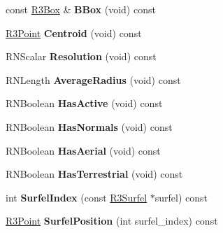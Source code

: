 \begin{DoxyCompactItemize}
\item 
const \hyperlink{class_r3_box}{R3\+Box} \& {\bfseries B\+Box} (void) const \hypertarget{class_r3_surfel_block_a199ed33bd0e6ecbac0a6fa9db61edbbc}{}\label{class_r3_surfel_block_a199ed33bd0e6ecbac0a6fa9db61edbbc}

\item 
\hyperlink{class_r3_point}{R3\+Point} {\bfseries Centroid} (void) const \hypertarget{class_r3_surfel_block_ab939d981e8601c1c534276e904ed0bae}{}\label{class_r3_surfel_block_ab939d981e8601c1c534276e904ed0bae}

\item 
R\+N\+Scalar {\bfseries Resolution} (void) const \hypertarget{class_r3_surfel_block_a190abcd92713a2d43b79f4eec1330361}{}\label{class_r3_surfel_block_a190abcd92713a2d43b79f4eec1330361}

\item 
R\+N\+Length {\bfseries Average\+Radius} (void) const \hypertarget{class_r3_surfel_block_a882e924ab6699914917994f6adb3276d}{}\label{class_r3_surfel_block_a882e924ab6699914917994f6adb3276d}

\item 
R\+N\+Boolean {\bfseries Has\+Active} (void) const \hypertarget{class_r3_surfel_block_a3b42233c643f7be3dee410ad08a4c1a4}{}\label{class_r3_surfel_block_a3b42233c643f7be3dee410ad08a4c1a4}

\item 
R\+N\+Boolean {\bfseries Has\+Normals} (void) const \hypertarget{class_r3_surfel_block_a0992d009761f9d22cd52d8bf8052607a}{}\label{class_r3_surfel_block_a0992d009761f9d22cd52d8bf8052607a}

\item 
R\+N\+Boolean {\bfseries Has\+Aerial} (void) const \hypertarget{class_r3_surfel_block_ac782863b9d9e89cbfa1622d8b0788277}{}\label{class_r3_surfel_block_ac782863b9d9e89cbfa1622d8b0788277}

\item 
R\+N\+Boolean {\bfseries Has\+Terrestrial} (void) const \hypertarget{class_r3_surfel_block_a7c65e70144256dd3db6bddabdec5d5dc}{}\label{class_r3_surfel_block_a7c65e70144256dd3db6bddabdec5d5dc}

\item 
int {\bfseries Surfel\+Index} (const \hyperlink{class_r3_surfel}{R3\+Surfel} $\ast$surfel) const \hypertarget{class_r3_surfel_block_aa84b98e8ad7d8c2398ca2c69e2c4a0a2}{}\label{class_r3_surfel_block_aa84b98e8ad7d8c2398ca2c69e2c4a0a2}

\item 
\hyperlink{class_r3_point}{R3\+Point} {\bfseries Surfel\+Position} (int surfel\+\_\+index) const \hypertarget{class_r3_surfel_block_a703b908e0e2bf511cd15b7c81223b502}{}\label{class_r3_surfel_block_a703b908e0e2bf511cd15b7c81223b502}


\end{DoxyCompactItemize}
